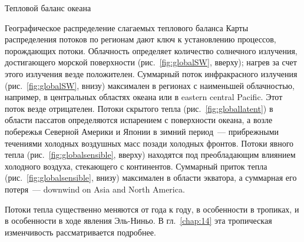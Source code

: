 \begin{chapter}{Тепловой баланс океана}
\begin{section}{Географическое распределение слагаемых теплового баланса}
Карты распределения потоков по регионам дают ключ к установлению процессов,
порождающих потоки. Облачность определяет количество солнечного излучения,
достигающего морской поверхности (рис.~\ref{fig:globalSW}, вверху); 
нагрев за счет этого излучения везде положителен. 
Суммарный поток инфракрасного излучения (рис.~\ref{fig:globalSW}, внизу)
максимален в регионах с наименьшей облачностью, например, в центральных 
областях океана или в eastern central Pacific. Этот поток везде отрицателен.
Потоки скрытого тепла (рис.~\ref{fig:globallatent}) в области пассатов определяются испарением
с поверхности океана, а возле побережья Северной Америки и Японии в зимний
период~--- прибрежными течениями холодных воздушных масс позади холодных
фронтов. Потоки явного тепла (рис.~\ref{fig:globalsensible}, вверху) 
находятся под преобладающим влиянием холодного воздуха, стекающего 
с континентов. Суммарный приток тепла (рис.~\ref{fig:globalsensible}, внизу) 
максимален в области экватора, а суммарная его потеря~--- downwind 
on Asia and North America.
%

Потоки тепла существенно меняются от года к году, в особенности в тропиках,
и в особенности в ходе явления Эль-Ниньо. В гл.~\ref{chap:14} эта тропическая 
изменчивость рассматривается подробнее.
%
\end{section}


\end{chapter}
